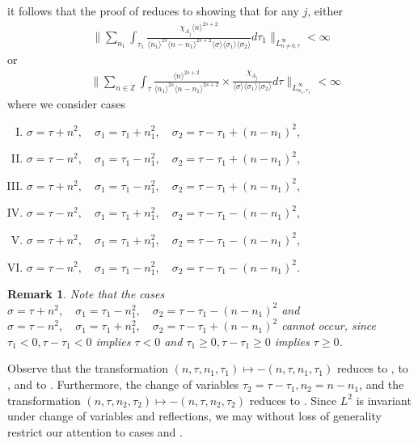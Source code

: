 \documentclass[12pt,reqno]{amsart}
\numberwithin{equation}{section}  %
\renewcommand{\cref}{\Cref}
\newcommand{\zz}{\mathbb{Z}}
\newcommand{\zzdot}{\dot{\zz}}
\newtheorem{remark}[theorem]{Remark}
\begin{document}
it follows that the proof of \cref{prop:bilinear-est} reduces to showing that
for any $j$, either 
\begin{equation}
\label{sup-est-gen-per-1}
\begin{split}
\|    \sum_{n_{1}} \int_{\tau_{1}} \frac{\chi_{A_{j}}\langle n \rangle ^{2s+2} }{\langle n_{1} \rangle ^{2s} \langle n-n_{1} \rangle ^{2s+2} 
\langle \sigma \rangle   \langle \sigma_{1} \rangle \langle  \sigma_{2}
\rangle}
d \tau_1  \|_{L^{\infty}_{n \neq 0, \tau}} < \infty
\end{split}
\end{equation}
or 
\begin{equation}
\label{sup-est-gen-per-2}
\begin{split}
& \| \sum_{n \in \zzdot} \int_{\tau} \frac{\langle n \rangle ^{2s+2}}
{\langle n_{1} \rangle^{2s}\langle n - n_{1}\rangle ^{2s+2}} 
\times \frac{\chi_{A_{j}}}{\langle \sigma \rangle  \langle
\sigma_{1} \rangle  \langle \sigma_{2} \rangle} d \tau 
\|_{L^{\infty}_{n_{1}, \tau_{1}}} < \infty
\end{split}
\end{equation}
where we consider cases
\begin{enumerate}[(I)]
\item{} $ \sigma=\tau+n^2,\quad \sigma_1=\tau_1+n_1^2,\quad \sigma_2=\tau -
\tau_1+(n - n_1)^2$,
\label{it-1}
\item{} $ \sigma=\tau-n^2,\quad \sigma_1=\tau_1-n_1^2,\quad \sigma_2=\tau - \tau_1+(n - n_1)^2$,
\label{it-2}
\item{}  $\sigma=\tau+n^2,\quad \sigma_1=\tau_1-n_1^2,\quad \sigma_2=\tau - \tau_1+(n - n_1)^2$,
\label{it-3}
\item{} $\sigma=\tau-n^2,\quad \sigma_1=\tau_1+n_1^2,\quad \sigma_2=\tau - \tau_1-(n - n_1)^2$,
\label{it-4}
\item{} $\sigma=\tau+n^2,\quad \sigma_1=\tau_1+n_1^2,\quad \sigma_2=\tau - \tau_1-(n - n_1)^2$,
\label{it-5}
\item{} $\sigma=\tau-n^2,\quad \sigma_1=\tau_1-n_1^2,\quad \sigma_2=\tau - \tau_1-(n - n_1)^2$.
\label{it-6}
\end{enumerate}
\begin{framed}
\begin{remark}
Note that the cases $\sigma=\tau+n^2,\quad \sigma_1=\tau_1-n_1^2,\quad
\sigma_2=\tau - \tau_1-(n - n_1)^2$ and $\sigma=\tau-n^2,\quad
\sigma_1=\tau_1+n_1^2,\quad \sigma_2=\tau - \tau_1+(n - n_1)^2$ cannot occur, since
$\tau_1< 0, \tau-\tau_1< 0$ implies $\tau<0$ and $\tau_1\geq 0, \tau-\tau_1\geq
0$ implies $\tau\geq 0$. 
\end{remark}
\end{framed}
Observe that the transformation $(n, \tau, n_{1}, \tau_{1}) \mapsto -(n, \tau,
n_{1}, \tau_{1})$ reduces  to ,  to
, and  to . Furthermore, the change of
variables $\tau_{2} = \tau - \tau_{1}, n_{2} = n - n_{1}$, and the
transformation $(n, \tau, n_{2}, \tau_{2}) \mapsto - (n, \tau, n_{2},
\tau_{2})$ reduces  to . Since $L^{2}$ is invariant
under change of variables and reflections, we may without loss of generality
restrict our attention to cases  and .
\end{document}

